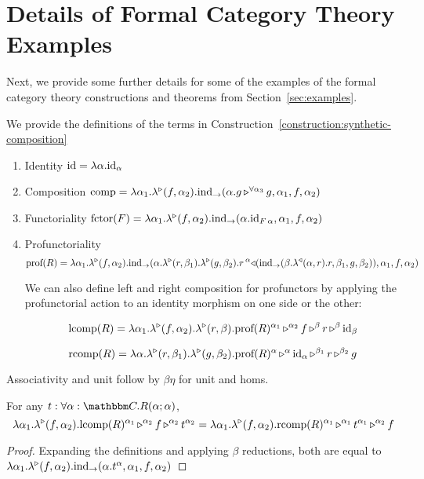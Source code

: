 \documentclass{llncs}
\begin{document}
\section{Details of Formal Category Theory Examples}
\label{sec:appendix:examples}

Next, we provide some further details for some of the examples of the
formal category theory constructions and theorems from
Section~\ref{sec:examples}.

\begin{definition}
  We provide the definitions of the terms in Construction~\ref{construction:synthetic-composition}
  \begin{enumerate}
  \item Identity $\id = \pendlambdaXdotY \alpha \punitrefl \alpha$
  \item Composition $\textrm{comp} = \lambdaunary {\alpha_1} f {\alpha_2} \punitelimkontZatABC {\alpha. \homrallXYtoZ {\alpha_3} g g} {\alpha_1} f {\alpha_2}$
  \item Functoriality $\textrm{fctor}(F) = \lambdaunary {\alpha_1} f {\alpha_2} \punitelimkontZatABC {\alpha. \punitrefl{F\,\alpha}} {\alpha_1} f {\alpha_2}$
  \item Profunctoriality
    \[\textrm{prof}(R) = \lambdaunary {\alpha_1} f {\alpha_2} {\punitelimkontZatABC {\alpha. \homrlambdaXatYdotZ r {\beta_1} \homrlambdaXatYdotZ g {\beta_2} {\homlappXtoYatZ {(\punitelimkontZatABC {\beta. \homllambdaXatYdotZ r \alpha r}{\beta_1}{g}{\beta_2})} {r} {\alpha}}}{\alpha_1} f {\alpha_2}}\]

    We can also define left and right composition for profunctors by
    applying the profunctorial action to an identity morphism on one side or
    the other:

    \[ \textrm{lcomp}(R) = \lambdabinary {\alpha_1} f {\alpha_2} r {\beta} {\apptrinary {\textrm{prof}(R)} {\alpha_1} f {\alpha_2} r {\beta} {\punitrefl \beta} {\beta}}\]
    
    \[ \textrm{rcomp}(R) = \lambdabinary {\alpha} r {\beta_1} g {\beta_2} {\apptrinary {\textrm{prof}(R)}  {\alpha} {\punitrefl \alpha} {\alpha} r {\beta_1} g {\beta_2}}\]
  \end{enumerate}
  Associativity and unit follow by $\beta\eta$ for unit and homs.
\end{definition}

\begin{lemma}[Naturality]
  For any $t : \pendallXdotY {\alpha:\cat C}{\harrapp R \alpha \alpha}$,
  \[ \lambdaunary {\alpha_1} f {\alpha_2} {\appbinary {\textrm{lcomp}(R)}{\alpha_1} f {\alpha_2} {\pendappXtoY t {\alpha_2}} {\alpha_2}}
  =  \lambdaunary {\alpha_1} f {\alpha_2} {\appbinary {\textrm{rcomp}(R)}{\alpha_1}  {\pendappXtoY t {\alpha_1}} {\alpha_1} f {\alpha_2}}\]
\end{lemma}
\begin{proof}
  Expanding the definitions and applying $\beta$ reductions, both are equal to $\lambdaunary {\alpha_1} f {\alpha_2} \punitelimkontZatABC {\alpha. \pendappXtoY t \alpha} {\alpha_1} f {\alpha_2}$
\end{proof}
\end{document}
